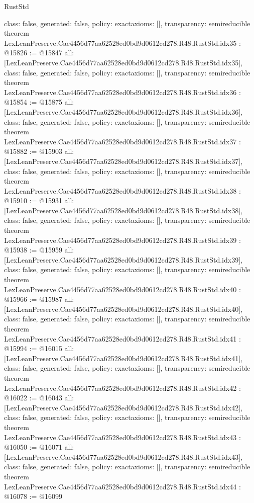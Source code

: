 \begin{lexlean}{RustStd}
\begin{coremodule}
{  class: false,
  generated: false,
  policy: exact{axioms: []},
  transparency: semireducible
}
theorem LexLeanPreserve.Cae4456d77aa62528ed0bd9d0612cd278.R48.RustStd.idx35 : @15826 := @15847 {
  all: [LexLeanPreserve.Cae4456d77aa62528ed0bd9d0612cd278.R48.RustStd.idx35],
  class: false,
  generated: false,
  policy: exact{axioms: []},
  transparency: semireducible
}
theorem LexLeanPreserve.Cae4456d77aa62528ed0bd9d0612cd278.R48.RustStd.idx36 : @15854 := @15875 {
  all: [LexLeanPreserve.Cae4456d77aa62528ed0bd9d0612cd278.R48.RustStd.idx36],
  class: false,
  generated: false,
  policy: exact{axioms: []},
  transparency: semireducible
}
theorem LexLeanPreserve.Cae4456d77aa62528ed0bd9d0612cd278.R48.RustStd.idx37 : @15882 := @15903 {
  all: [LexLeanPreserve.Cae4456d77aa62528ed0bd9d0612cd278.R48.RustStd.idx37],
  class: false,
  generated: false,
  policy: exact{axioms: []},
  transparency: semireducible
}
theorem LexLeanPreserve.Cae4456d77aa62528ed0bd9d0612cd278.R48.RustStd.idx38 : @15910 := @15931 {
  all: [LexLeanPreserve.Cae4456d77aa62528ed0bd9d0612cd278.R48.RustStd.idx38],
  class: false,
  generated: false,
  policy: exact{axioms: []},
  transparency: semireducible
}
theorem LexLeanPreserve.Cae4456d77aa62528ed0bd9d0612cd278.R48.RustStd.idx39 : @15938 := @15959 {
  all: [LexLeanPreserve.Cae4456d77aa62528ed0bd9d0612cd278.R48.RustStd.idx39],
  class: false,
  generated: false,
  policy: exact{axioms: []},
  transparency: semireducible
}
theorem LexLeanPreserve.Cae4456d77aa62528ed0bd9d0612cd278.R48.RustStd.idx40 : @15966 := @15987 {
  all: [LexLeanPreserve.Cae4456d77aa62528ed0bd9d0612cd278.R48.RustStd.idx40],
  class: false,
  generated: false,
  policy: exact{axioms: []},
  transparency: semireducible
}
theorem LexLeanPreserve.Cae4456d77aa62528ed0bd9d0612cd278.R48.RustStd.idx41 : @15994 := @16015 {
  all: [LexLeanPreserve.Cae4456d77aa62528ed0bd9d0612cd278.R48.RustStd.idx41],
  class: false,
  generated: false,
  policy: exact{axioms: []},
  transparency: semireducible
}
theorem LexLeanPreserve.Cae4456d77aa62528ed0bd9d0612cd278.R48.RustStd.idx42 : @16022 := @16043 {
  all: [LexLeanPreserve.Cae4456d77aa62528ed0bd9d0612cd278.R48.RustStd.idx42],
  class: false,
  generated: false,
  policy: exact{axioms: []},
  transparency: semireducible
}
theorem LexLeanPreserve.Cae4456d77aa62528ed0bd9d0612cd278.R48.RustStd.idx43 : @16050 := @16071 {
  all: [LexLeanPreserve.Cae4456d77aa62528ed0bd9d0612cd278.R48.RustStd.idx43],
  class: false,
  generated: false,
  policy: exact{axioms: []},
  transparency: semireducible
}
theorem LexLeanPreserve.Cae4456d77aa62528ed0bd9d0612cd278.R48.RustStd.idx44 : @16078 := @16099 {
}
\end{coremodule}
\end{lexlean}

